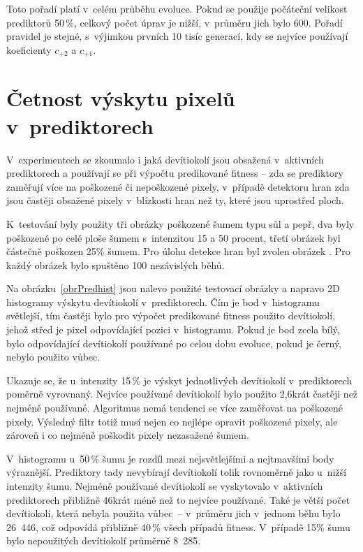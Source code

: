 Toto pořadí platí v~celém průběhu evoluce. Pokud se použije počáteční velikost prediktorů 50\,\%, celkový počet úprav je nižší, v~průměru jich bylo 600. Pořadí pravidel je stejné, s~výjimkou prvních 10 tisíc generací, kdy se nejvíce používají koeficienty $c_{+2}$ a $c_{+1}$.

\section{Četnost výskytu pixelů v~prediktorech}
\label{secExpPredhist}

V~experimentech se zkoumalo i jaká devítiokolí jsou obsažená v~aktivních prediktorech a používají se při výpočtu predikované fitness -- zda se prediktory zaměřují více na poškozené či nepoškozené pixely, v~případě detektoru hran zda jsou častěji obsažené pixely v~blízkosti hran než ty, které jsou uprostřed ploch.

K~testování byly použity tři obrázky poškozené šumem typu sůl a pepř, dva byly poškozené po celé ploše šumem s~intenzitou 15 a 50 procent, třetí obrázek byl částečně poškozen 25\% šumem. Pro úlohu detekce hran byl zvolen obrázek . Pro každý obrázek bylo spuštěno 100 nezávislých běhů.

Na obrázku~\ref{obrPredhist} jsou nalevo použité testovací obrázky a napravo 2D histogramy výskytu devítiokolí v~prediktorech. Čím je bod v~histogramu světlejší, tím častěji bylo pro výpočet predikované fitness použito devítiokolí, jehož střed je pixel odpovídající pozici v~histogramu. Pokud je bod zcela bílý, bylo odpovídající devítiokolí používané po celou dobu evoluce, pokud je černý, nebylo použito vůbec.

Ukazuje se, že u~intenzity 15\,\% je výskyt jednotlivých devítiokolí v~prediktorech poměrně vyrovnaný. Nejvíce používané devítiokolí bylo použito 2,6krát častěji než nejméně používané. Algoritmus nemá tendenci se více zaměřovat na poškozené pixely. Výsledný filtr totiž musí nejen co nejlépe opravit poškozené pixely, ale zároveň i co nejméně poškodit pixely nezasažené šumem.

V~histogramu u~50\,\% šumu je rozdíl mezi nejsvětlejšími a nejtmavšími body výraznější. Prediktory tady nevybírají devítiokolí tolik rovnoměrně jako u~nižší intenzity šumu. Nejméně používané devítiokolí se vyskytovalo v~aktivních prediktorech přibližně 46krát méně než to nejvíce používané. Také je větší počet devítiokolí, která nebyla použita vůbec~-- v~průměru jich v~jednom běhu bylo 26~446, což odpovídá přibližně 40\,\% všech případů fitness. V~případě 15\% šumu bylo nepoužitých devítiokolí průměrně 8~285.

